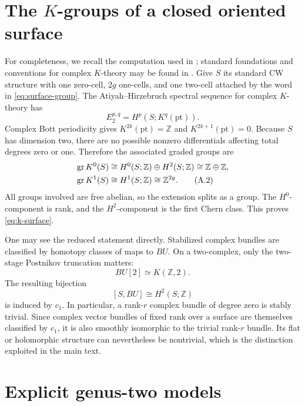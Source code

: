 \documentclass[11pt]{article}
\theoremstyle{definition}
\theoremstyle{remark}
\newcommand{\ZZ}{\mathbb Z}
\begin{document}
\appendix

\section{The \texorpdfstring{\(K\)}{K}-groups of a closed oriented surface}
\label{app:k-surface}

For completeness, we recall the computation used in
; standard foundations and conventions for complex
\(K\)-theory may be found in \cite{AtiyahKTheory,KaroubiKTheory}.  Give \(S\)
its standard CW structure with one zero-cell, \(2g\) one-cells, and one
two-cell attached by the word in \eqref{eq:surface-group}.  The
Atiyah--Hirzebruch spectral sequence for complex \(K\)-theory has
\[
             E_2^{p,q}=H^p(S;K^q(\mathrm{pt})).
             \tag{A.1}\label{eq:AHSS}
\]
Complex Bott periodicity gives \(K^{2k}(\mathrm{pt})=\ZZ\) and
\(K^{2k+1}(\mathrm{pt})=0\).  Because \(S\) has dimension two, there are no
possible nonzero differentials affecting total degrees zero or one.
Therefore the associated graded groups are
\begin{align}
\operatorname{gr}K^0(S)
   &\cong H^0(S;\ZZ)\oplus H^2(S;\ZZ)
     \cong\ZZ\oplus\ZZ, \notag\\
\operatorname{gr}K^1(S)
   &\cong H^1(S;\ZZ)
     \cong\ZZ^{2g}.
     \tag{A.2}\label{eq:graded-k}
\end{align}
All groups involved are free abelian, so the extension splits as a group.
The \(H^0\)-component is rank, and the \(H^2\)-component is the first Chern
class.  This proves \eqref{eq:k-surface}.

One may see the reduced statement directly.  Stabilized complex bundles are
classified by homotopy classes of maps to \(BU\).  On a two-complex, only the
two-stage Postnikov truncation matters:
\[
                       BU[2]\simeq K(\ZZ,2).
                       \tag{A.3}\label{eq:BU-two-stage}
\]
The resulting bijection
\[
             [S,BU]\cong H^2(S;\ZZ)
             \tag{A.4}\label{eq:BU-H2}
\]
is induced by \(c_1\).  In particular, a rank-\(r\) complex bundle of degree
zero is stably trivial.  Since complex vector bundles of fixed rank over a
surface are themselves classified by \(c_1\), it is also smoothly isomorphic
to the trivial rank-\(r\) bundle.  Its flat or holomorphic structure can
nevertheless be nontrivial, which is the distinction exploited in the main
text.

\section{Explicit genus-two models}
\label{app:genus-two}
\end{document}
